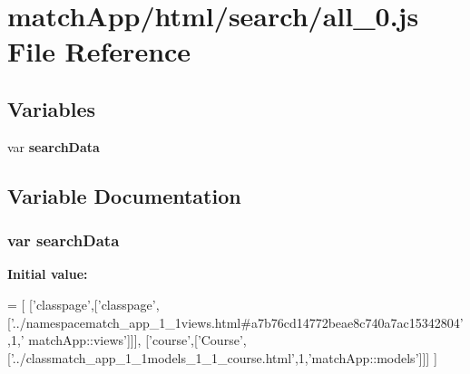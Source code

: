 \section{match\+App/html/search/all\+\_\+0.js File Reference}
\label{all__0_8js}
\subsection*{Variables}
\begin{DoxyCompactItemize}
\item 
var {\bf search\+Data}
\end{DoxyCompactItemize}


\subsection{Variable Documentation}
\subsubsection[{search\+Data}]{\setlength{\rightskip}{0pt plus 5cm}var search\+Data}\label{all__0_8js_ad01a7523f103d6242ef9b0451861231e}
{\bfseries Initial value\+:}
\begin{DoxyCode}
=
[
  [\textcolor{stringliteral}{'classpage'},[\textcolor{stringliteral}{'classpage'},[\textcolor{stringliteral}{'../namespacematch\_app\_1\_1views.html#a7b76cd14772beae8c740a7ac15342804'},1,\textcolor{stringliteral}{'
      matchApp::views'}]]],
  [\textcolor{stringliteral}{'course'},[\textcolor{stringliteral}{'Course'},[\textcolor{stringliteral}{'../classmatch\_app\_1\_1models\_1\_1\_course.html'},1,\textcolor{stringliteral}{'matchApp::models'}]]]
]
\end{DoxyCode}

